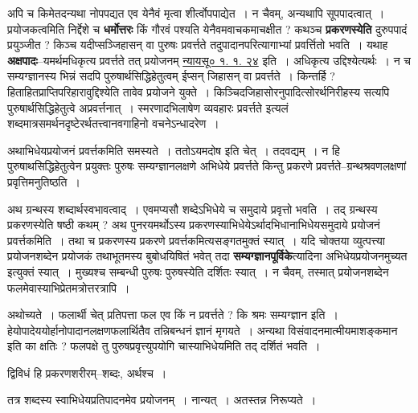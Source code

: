 \documentclass[article,12pt,a4paper]{memoir}
\begin{document}
	  \pstart अपि च किमेतदन्यथा नोपपद्यत एव येनैवं मृत्वा शीर्त्वोपपाद्येत । न चैवम्, अन्यथापि सूपपादत्वात् । प्रयोजकत्वमिति निर्द्देशे च \textbf{धर्मोत्तरः} किं गौरवं पश्यति येनैवमवाचकमाचक्षीत ? कथञ्च \textbf{प्रकरणस्येति} दुरुपपादं प्रयुञ्जीत ? किञ्च यदीप्सञ्जिहासन् वा पुरुषः प्रवर्त्तते तदुपादानपरित्यागाभ्यां प्रवर्त्तितो भवति । यथाह \textbf{अक्षपादः}--यमर्थमधिकृत्य प्रवर्त्तते तत् प्रयोजनम् \href{http://sarit.indology.info/?cref=ns.1.1.24}{न्यायसू० १. १. २४} इति । अधिकृत्य उद्दिश्येत्यर्थः । न च सम्यग्ज्ञानस्य भिन्नं सदपि पुरुषार्थसिद्धिहेतुत्वम् ईप्सन् जिहासन् वा प्रवर्त्तते । किन्तर्हि ? हिताहितप्राप्तिपरिहारावुद्दिश्येति तावेव प्रयोजने युक्ते । किञ्चिदजिहासोरनुपादित्सोरर्थनिरीह\leavevmode{}स्य सत्यपि पुरुषार्थसिद्धिहेतुत्वे अप्रवर्त्तनात् । स्मरणादभिलाषेण व्यवहारः प्रवर्त्तते इत्यलं शब्दमात्रसमर्थनदृष्टेरर्थतत्त्वानवगाहिनो वचनेऽन्धादरेण ।
	\pend
      

	  \pstart अथाभिधेयप्रयोजनं प्रवर्त्तकमिति समस्यते । ततोऽयमदोष इति चेत् । तदवद्यम् । न हि पुरुषाथसिद्धिहेतुत्वेन प्रयुक्तः पुरुषः सम्यग्ज्ञानलक्षणे अभिधेये प्रवर्त्तते किन्तु प्रकरणे प्रवर्त्तते--ग्रन्थश्रवणलक्षणां प्रवृत्तिमनुतिष्ठति ।
	\pend
      

	  \pstart अथ ग्रन्थस्य शब्दार्थस्वभावत्वाद् । एवमप्यसौ शब्देऽभिधेये च समुदाये प्रवृत्तो भवति । तद् ग्रन्थस्य प्रकरणस्येति षष्ठी कथम् ? अथ पुनरयमर्थोऽस्य प्रकरणस्याभिधेयेऽर्थादभिधानाभिधेयसमुदाये प्रयोजनं प्रवर्त्तकमिति । तथा च प्रकरणस्य प्रकरणे प्रवर्त्तकमित्यसङ्गतमुक्तं स्यात् । यदि चोक्तया व्युत्पत्त्या प्रयोजनशब्देन प्रयोजकं तथाभूतमस्य बुबोधयिषितं भवेत् तदा \textbf{सम्यग्ज्ञानपूर्विके}त्यादिना अभिधेयप्रयोजनमुच्यत इत्युक्तं स्यात् । मुख्यश्च सम्बन्धी पुरुषः पुरुषस्येति दर्शितः स्यात् । न चैवम्, तस्मात् प्रयोजनशब्देन फलमेवास्याभिप्रेतमत्रोत्तरत्रापि ।
	\pend
      

	  \pstart अथोच्यते । फलार्थी चेत् प्रतिपत्ता फल एव किं न प्रवर्त्तते ? कि श्रमः सम्यग्ज्ञान इति । हेयोपादेययोर्हानोपादानलक्षणफलार्थितैव तन्निबन्धनं ज्ञानं मृगयते । अन्यथा विसंवादनमात्मीयमाशङ्कमान इति का क्षतिः ? फलपक्षे तु पुरुषप्रवृत्त्युपयोगि चास्याभिधेयमिति तद् दर्शितं भवति ।
	\pend
	  \bigskip
	  \begingroup
	

	  \pstart द्विविधं हि प्रकरणशरीरम्--शब्दः, अर्थश्च ।
	\pend
        

	  \pstart तत्र शब्दस्य स्वाभिधेयप्रतिपादनमेव प्रयोजनम् । नान्यत् । अतस्तन्न निरूप्यते ।
	\pend
        
\end{document}
